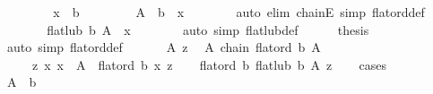 \begin{isabellebody}
\ \ \isamarkupfalse%
\isanewline
\ \ \ \ \isamarkupfalse%
\ {\isachardoublequoteopen}x\ {\isasymnoteq}\ b{\isachardoublequoteclose}\isanewline
\ \ \ \ \isamarkupfalse%
\ {}\ \isamarkupfalse%
\ {\isachardoublequoteopen}A\ {\isacharminus}{\kern0pt}\ {\isacharbraceleft}{\kern0pt}b{\isacharbraceright}{\kern0pt}\ {\isacharequal}{\kern0pt}\ {\isacharbraceleft}{\kern0pt}x{\isacharbraceright}{\kern0pt}{\isachardoublequoteclose}\isanewline
\ \ \ \ \ \ \isamarkupfalse%
\ {\isacharparenleft}{\kern0pt}auto\ elim{\isacharcolon}{\kern0pt}\ chainE\ simp{\isacharcolon}{\kern0pt}\ flat{\isacharunderscore}{\kern0pt}ord{\isacharunderscore}{\kern0pt}def{\isacharparenright}{\kern0pt}\isanewline
\ \ \ \ \isamarkupfalse%
\ \isamarkupfalse%
\ {\isachardoublequoteopen}flat{\isacharunderscore}{\kern0pt}lub\ b\ A\ {\isacharequal}{\kern0pt}\ x{\isachardoublequoteclose}\isanewline
\ \ \ \ \ \ \isamarkupfalse%
\ {\isacharparenleft}{\kern0pt}auto\ simp{\isacharcolon}{\kern0pt}\ flat{\isacharunderscore}{\kern0pt}lub{\isacharunderscore}{\kern0pt}def{\isacharparenright}{\kern0pt}\isanewline
\ \ \ \ \isamarkupfalse%
\ {\isacharquery}{\kern0pt}thesis\ \isamarkupfalse%
\ {\isacharparenleft}{\kern0pt}auto\ simp{\isacharcolon}{\kern0pt}\ flat{\isacharunderscore}{\kern0pt}ord{\isacharunderscore}{\kern0pt}def{\isacharparenright}{\kern0pt}\isanewline
\ \ \isamarkupfalse%
\isanewline
{}\isamarkupfalse%
\isanewline
\ \ \isamarkupfalse%
\ A\ z\ \isamarkupfalse%
\ A{\isacharcolon}{\kern0pt}\ {\isachardoublequoteopen}chain\ {\isacharparenleft}{\kern0pt}flat{\isacharunderscore}{\kern0pt}ord\ b{\isacharparenright}{\kern0pt}\ A{\isachardoublequoteclose}\isanewline
\ \ \ \ \ z{\isacharcolon}{\kern0pt}\ {\isachardoublequoteopen}{\isasymAnd}x{\isachardot}{\kern0pt}\ x\ {\isasymin}\ A\ {\isasymLongrightarrow}\ flat{\isacharunderscore}{\kern0pt}ord\ b\ x\ z{\isachardoublequoteclose}\isanewline
\ \ \isamarkupfalse%
\ {\isachardoublequoteopen}flat{\isacharunderscore}{\kern0pt}ord\ b\ {\isacharparenleft}{\kern0pt}flat{\isacharunderscore}{\kern0pt}lub\ b\ A{\isacharparenright}{\kern0pt}\ z{\isachardoublequoteclose}\isanewline
\ \ \isamarkupfalse%
\ cases\isanewline
\ \ \ \ \isamarkupfalse%
\ {\isachardoublequoteopen}A\ {\isasymsubseteq}\ {\isacharbraceleft}{\kern0pt}b{\isacharbraceright}{\kern0pt}{\isachardoublequoteclose}\isanewline

\end{isabellebody}
